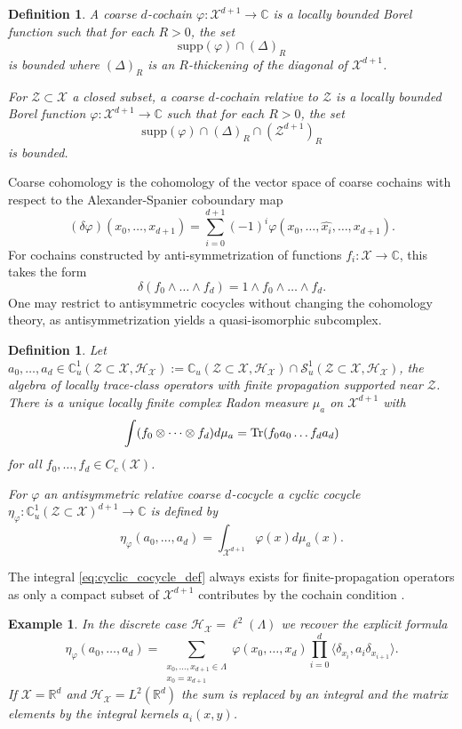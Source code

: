 \documentclass[12pt]{amsart}
\newtheorem{definition}[theorem]{Definition}
\newtheorem{example}[theorem]{Example}
\newcommand{\CM}{{\mathbb C}}
\newcommand{\RM}{{\mathbb R}}
\newcommand{\Ss}{{\mathcal S}}
\newcommand{\Hh}{{\mathcal H}}
\newcommand{\Xx}{{\mathcal X}}
\newcommand{\Zz}{{\mathcal Z}}
\newcommand{\Tr}{\mbox{\rm Tr}}
\begin{document}
\begin{definition}
A coarse $d$-cochain $\varphi: \Xx^{d+1}\to \CM$ is a locally bounded Borel function such that for each $R>0$, the set
$$\mathrm{supp}(\varphi)\cap (\Delta)_R$$
is bounded where $(\Delta)_R$ is an $R$-thickening of the diagonal of $\Xx^{d+1}$.

For $\Zz\subset \Xx$ a closed subset, a coarse $d$-cochain relative to $\Zz$ is a locally bounded Borel function $\varphi: \Xx^{d+1}\to \CM$ such that for each $R>0$, the set
$$\mathrm{supp}(\varphi)\cap (\Delta)_R \cap (\Zz^{d+1})_R$$
is bounded.
\end{definition}
Coarse cohomology is the cohomology of the vector space of coarse cochains with respect to the Alexander-Spanier coboundary map
$$(\delta\varphi)(x_0,\dots,x_{d+1})=\sum_{i=0}^{d+1} (-1)^i \varphi(x_0,\dots,\widehat{x_i},\dots,x_{d+1}).$$
For cochains constructed by anti-symmetrization of functions $f_i:\Xx\to \CM$, this takes the form
$$\delta(f_0\wedge \dots \wedge f_d)= 1\wedge f_0\wedge \dots \wedge f_d.$$
One may restrict to antisymmetric cocycles without changing the cohomology theory, as antisymmetrization yields a quasi-isomorphic subcomplex.

\begin{definition}\cite[Section 4.2]{Roe1993}
\label{def:cyclic_cocycle_def}
Let $a_0,\dots,a_d \in \CM^1_u(\Zz\subset \Xx, \Hh_\Xx):= \CM_u(\Zz\subset \Xx, \Hh_\Xx)\cap \Ss_u^1(\Zz\subset \Xx, \Hh_\Xx)$, the algebra of locally trace-class operators with finite propagation supported near $\Zz$. There is a unique locally finite complex Radon measure $\mu_a$ on $\Xx^{d+1}$ with
$$\int (f_0\otimes \dots \otimes f_d) d\mu_a = \Tr(f_0 a_0 \dots f_d a_d)$$
for all $f_0,\dots,f_d\in C_c(\Xx)$.

For $\varphi$ an antisymmetric relative coarse $d$-cocycle a cyclic cocycle $\eta_{\varphi}: \CM_u^1(\Zz\subset \Xx)^{d+1} \to \CM$ is defined by
\begin{equation}
\label{eq:cyclic_cocycle_def}
\eta_{\varphi}(a_0,\dots,a_d)= \int_{\Xx^{d+1}} \varphi(x) d \mu_a(x).
\end{equation}
\end{definition}
The integral \eqref{eq:cyclic_cocycle_def} always exists for finite-propagation operators as only a compact subset of $\Xx^{d+1}$ contributes by the cochain condition \cite[Corollary 4.18]{Roe1993}.

\begin{example}\label{ex:cyclic_cocycle_discrete}
In the discrete case $\Hh_\Xx=\ell^2(\Lambda)$ we recover the explicit formula
$$\eta_{\varphi}(a_0,\dots,a_d)= \sum_{\substack{x_0,\dots,x_{d+1} \in \Lambda\\ x_0=x_{d+1}}} \varphi(x_0,\dots,x_d) \prod_{i=0}^d \langle \delta_{x_i}, a_i \delta_{x_{i+1}}\rangle.$$
If $\Xx=\RM^d$ and $\Hh_\Xx=L^2(\RM^d)$ the sum is replaced by an integral and the matrix elements by the integral kernels $a_i(x, y)$.
\end{example}
\end{document}
